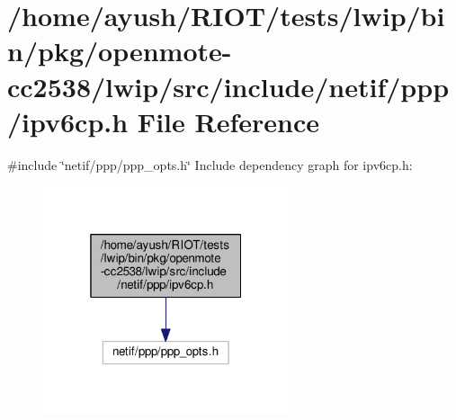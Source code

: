 \hypertarget{openmote-cc2538_2lwip_2src_2include_2netif_2ppp_2ipv6cp_8h}{}\section{/home/ayush/\+R\+I\+O\+T/tests/lwip/bin/pkg/openmote-\/cc2538/lwip/src/include/netif/ppp/ipv6cp.h File Reference}
\label{openmote-cc2538_2lwip_2src_2include_2netif_2ppp_2ipv6cp_8h}
{\ttfamily \#include \char`\"{}netif/ppp/ppp\+\_\+opts.\+h\char`\"{}}\newline
Include dependency graph for ipv6cp.\+h\+:
\nopagebreak
\begin{figure}[H]
\begin{center}
\leavevmode
\includegraphics[width=205pt]{openmote-cc2538_2lwip_2src_2include_2netif_2ppp_2ipv6cp_8h__incl}
\end{center}
\end{figure}

